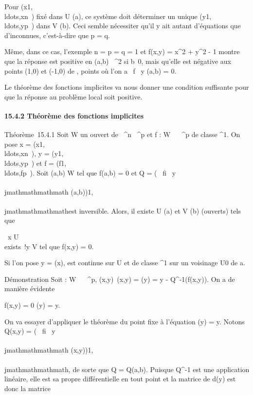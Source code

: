 Pour
(x1,\\ldots,xn~)
fixé dans U \inV(a), ce système doit déterminer un unique
(y1,\\ldots,yp~)
dans V \inV(b). Ceci semble nécessiter qu'il y ait autant d'équations que
d'inconnues, c'est-à-dire que p = q.

Même, dans ce cas, l'exemple n = p = q = 1 et f(x,y) = x^2 +
y^2 - 1 montre que la réponse est positive en (a,b) \in
{}~^2 si b\neq~0, mais qu'elle est
négative aux points (1,0) et (-1,0) de \Gamma, points où l'on a  \partial~f
\over \partial~y (a,b) = 0.

Le théorème des fonctions implicites va nous donner une condition
suffisante pour que la réponse au problème local soit positive.

\paragraph{15.4.2 Théorème des fonctions implicites}

Théorème~15.4.1 Soit W un ouvert de ~^n \times {}~^p et f
: W \rightarrow~ ~^p de classe ^1. On pose x =
(x1,\\ldots,xn~),
y =
(y1,\\ldots,yp~)
et f =
(f1,\\ldots,fp~).
Soit (a,b) \in W tel que f(a,b) = 0 et Q = \left (
\partial~fi \over \partial~y\\\\jmathmathmathmath
(a,b)\right )1\leqi,\\\\jmathmathmathmath\leqp est inversible. Alors, il
existe U \inV(a) et V \inV(b) (ouverts) tels que

\forall~x \in U \\exists~!y \in V
\text tel que f(x,y) = 0.

Si l'on pose y = \phi(x), \phi est continue sur U et de classe ^1
sur un voisinage U0 de a.

Démonstration Soit \psi : W \rightarrow~ ~^p,
(x,y)\mapsto~\psi(x,y) = \psix(y) = y -
Q^-1(f(x,y)). On a de manière évidente

f(x,y) = 0 \Leftrightarrow \psix(y) = y.

On va essayer d'appliquer le théorème du point fixe à l'équation
\psix(y) = y. Notons Q(x,y) = \left (
\partial~fi \over \partial~y\\\\jmathmathmathmath
(x,y)\right )1\leqi,\\\\jmathmathmathmath\leqp, de sorte que Q = Q(a,b).
Puisque Q^-1 est une application linéaire, elle est sa propre
différentielle en tout point et la matrice de d\psix(y) est donc
la matrice

